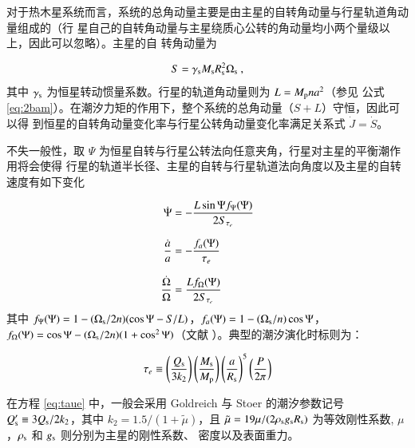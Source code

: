 对于热木星系统而言，系统的总角动量主要是由主星的自转角动量与行星轨道角动量组成的（行
星自己的自转角动量与主星绕质心公转的角动量均小两个量级以上，因此可以忽略）。主星的自
转角动量为

\begin{equation} \label{eq:spinam}
S = \gamma_\mathrm{s} M_\mathrm{s} R_\mathrm{s}^2 \Omega_\mathrm{s} \ ,
\end{equation} 
其中 $\gamma_\mathrm{s}$ 为恒星转动惯量系数。行星的轨道角动量则为 $L = M_\mathrm{p}na^2$（参见
公式 \ref{eq:2bam}）。在潮汐力矩的作用下，整个系统的总角动量（$S+L$）守恒，因此可以得
到恒星的自转角动量变化率与行星公转角动量变化率满足关系式 $\dot{J} = \dot{S}$。

不失一般性，取 $\Psi$ 为恒星自转与行星公转法向任意夹角，行星对主星的平衡潮作用将会使得
行星的轨道半长径、主星的自转与行星轨道法向角度以及主星的自转速度有如下变化

\begin{subequations} \label{eq:tidalevo}
\setlength{\jot}{10pt}
\begin{align}
   \dot{\Psi} &= - \frac{L\sin \Psi f_\Psi(\Psi)}{2S_{\tau_e}}     \label{eq:obevo} \\
    \frac{\dot{a}}{a} &= - \frac{f_a(\Psi)}{\tau_e}   \label{eq:smaevo}  \\
    \frac{\dot{\Omega}}{\Omega} & = \frac{Lf_\Omega(\Psi)}{2S_{\tau_e}} \label{eq:spinevo}
\end{align}
\end{subequations} 
其中 $f_\Psi(\Psi) = 1 - (\Omega_\mathrm{s}/2n)(\cos\Psi - S/L)$，$f_a(\Psi) = 1 - (\Omega_\mathrm{s}/n)\cos\Psi$，
$f_\Omega(\Psi) = \cos\Psi - (\Omega_\mathrm{s}/2n)(1+ \cos^2\Psi)$（文献 ）。典型的潮汐演化时标则为：

\begin{equation} \label{eq:taue}
\tau_e \equiv \left( {Q_\mathrm{s} \over 3 k_2} \right) \left( {M_\mathrm{s} \over M_\mathrm{p}}\right)
\left( {a \over R_\mathrm{s}}\right)^5 \left( {P \over 2 \pi} \right) 
\end{equation} 

在方程 \ref{eq:taue} 中，一般会采用 Goldreich 与 Stoer 的潮汐参数记号 $Q_\mathrm{s}^\prime \equiv 3 
Q_\mathrm{s}/2k_2$，其中 $k_2 =1.5/(1+{\tilde \mu})$，且 ${\tilde \mu} = 19 \mu/(2 \rho_\mathrm{s} 
g_\mathrm{s} R_\mathrm{s})$ 为等效刚性系数, $\mu$，$\rho_\mathrm{s}$ 和 $g_\mathrm{s}$ 则分别为主星的刚性系数、
密度以及表面重力。

